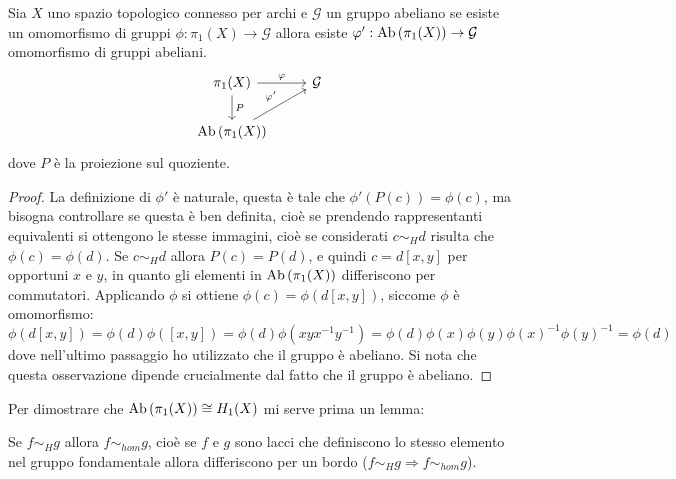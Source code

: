 
\begin{osservation}
  Sia $ X $ uno spazio topologico connesso per archi e $ \mathcal{G} $ un gruppo
  abeliano se esiste un omomorfismo di gruppi $ \phi: \pi_1(X) \to \mathcal{G} $ allora
  esiste $ \varphi' : \mathrm{Ab}\left( \pi_1(X) \right) \to \mathcal{G} $ omomorfismo di gruppi abeliani.
  \[
    \begin{tikzcd}
      \pi_1(X) \arrow{r}{\phi} \arrow{d}{P} & \mathcal{G} \\
      \Ab{\pi_1(X)} \arrow{ur}{\phi'}
    \end{tikzcd}
  \]
  dove $ P $ è la proiezione sul quoziente.
\end{osservation}
\begin{proof}
  La definizione di $ \phi' $ è naturale, questa è tale che
  $ \phi'(P(c)) = \phi(c) $, ma bisogna controllare se questa è ben definita, cioè se
  prendendo rappresentanti equivalenti si ottengono le stesse immagini, cioè se
  considerati $ c \sim_H d $ risulta che $ \phi(c) = \phi(d) $. Se
  $ c \sim_H d $ allora $ P(c) = P(d) $, e quindi $ c = d[x,y] $ per opportuni
  $ x $ e $ y $, in quanto gli elementi in $ \mathrm{Ab}\left( \pi_1(X) \right) $ differiscono per
  commutatori. Applicando $ \phi $ si ottiene $ \phi(c) = \phi(d[x,y]) $, siccome
  $ \phi $ è omomorfismo:
  \[
    \phi(d[x,y]) = \phi(d)\phi([x,y]) = \phi(d) \phi(xyx^{-1}y^{-1}) = \phi(d) \phi(x) \phi(y) \phi(x)^{-1} \phi(y)^{-1} = \phi(d)
  \]
  dove nell'ultimo passaggio ho utilizzato che il gruppo è abeliano.
  Si nota che questa osservazione dipende crucialmente dal fatto che il gruppo è abeliano.
\end{proof}
\eproof
Per dimostrare che $ \mathrm{Ab}\left( \pi_1(X) \right) \cong H_1(X) $ mi serve prima un lemma:
\begin{lemma}
  Se $ f \sim_H g $ allora $ f \sim_{hom} g $, cioè se $ f $ e $ g $ sono lacci che
  definiscono lo stesso elemento nel gruppo fondamentale allora differiscono per
  un bordo ($ f \sim_H g \Rightarrow f \sim_{hom} g $).
\end{lemma}

